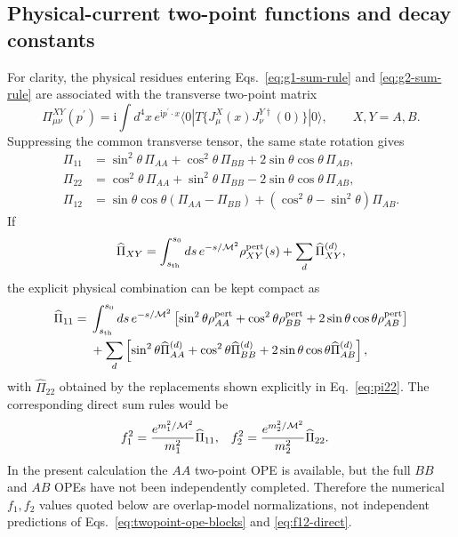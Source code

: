 \documentclass[aps,prd,preprint,nofootinbib,superscriptaddress]{revtex4-2}
\newcommand{\ii}{\mathrm{i}}
\begin{document}
\subsection{Physical-current two-point functions and decay constants}

For clarity, the physical residues entering Eqs.~\eqref{eq:g1-sum-rule} and
\eqref{eq:g2-sum-rule} are associated with the transverse two-point matrix
\begin{equation}
  \Pi_{\mu\nu}^{XY}(p^{\prime})=
  \ii\int d^4x\,e^{\ii p^{\prime}\cdot x}
  \langle0|T\{J_\mu^X(x)J_\nu^{Y\dagger}(0)\}|0\rangle,
  \qquad X,Y=A,B.
  \label{eq:twopoint-basis}
\end{equation}
Suppressing the common transverse tensor, the same state rotation gives
\begin{align}
  \Pi_{11}&=\sin^2\theta\,\Pi_{AA}+\cos^2\theta\,\Pi_{BB}
  +2\sin\theta\cos\theta\,\Pi_{AB},
  \label{eq:pi11}\\
  \Pi_{22}&=\cos^2\theta\,\Pi_{AA}+\sin^2\theta\,\Pi_{BB}
  -2\sin\theta\cos\theta\,\Pi_{AB},
  \label{eq:pi22}\\
  \Pi_{12}&=\sin\theta\cos\theta(\Pi_{AA}-\Pi_{BB})
  +(\cos^2\theta-\sin^2\theta)\Pi_{AB}.
  \label{eq:pi12}
\end{align}
If
\begin{equation}
  \widehat\Pi_{XY}=\int_{s_{\rm th}}^{s_0}ds\,
  e^{-s/{\cal M}^2}\rho_{XY}^{\rm pert}(s)
  +\sum_d\widehat\Pi_{XY}^{(d)},
  \label{eq:twopoint-ope-blocks}
\end{equation}
the explicit physical combination can be kept compact as
\begin{align}
  \widehat\Pi_{11}={}&\int_{s_{\rm th}}^{s_0}ds\,
  e^{-s/{\cal M}^2}
  \left[\sin^2\theta\rho_{AA}^{\rm pert}
  +\cos^2\theta\rho_{BB}^{\rm pert}
  +2\sin\theta\cos\theta\rho_{AB}^{\rm pert}\right]
  \notag\\
  &+\sum_d\left[\sin^2\theta\widehat\Pi_{AA}^{(d)}
  +\cos^2\theta\widehat\Pi_{BB}^{(d)}
  +2\sin\theta\cos\theta\widehat\Pi_{AB}^{(d)}\right],
  \label{eq:pi11-ope-explicit}
\end{align}
with $\widehat\Pi_{22}$ obtained by the replacements shown explicitly in
Eq.~\eqref{eq:pi22}.  The corresponding direct sum rules would be
\begin{align}
  f_1^2&=\frac{e^{m_1^2/{\cal M}^2}}{m_1^2}\widehat\Pi_{11},&
  f_2^2&=\frac{e^{m_2^2/{\cal M}^2}}{m_2^2}\widehat\Pi_{22}.
  \label{eq:f12-direct}
\end{align}
In the present calculation the $AA$ two-point OPE is available, but the full
$BB$ and $AB$ OPEs have not been independently completed.  Therefore the
numerical $f_1,f_2$ values quoted below are overlap-model normalizations, not
independent predictions of Eqs.~\eqref{eq:twopoint-ope-blocks} and
\eqref{eq:f12-direct}.
\end{document}
